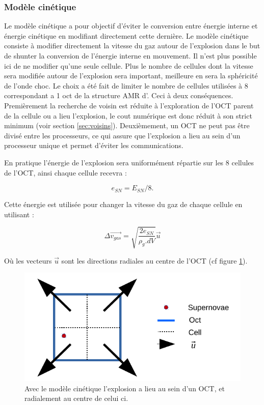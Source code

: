 \subsubsection{Modèle cinétique}

Le modèle cinétique a pour objectif d'éviter le conversion entre énergie interne et énergie cinétique en modifiant directement cette dernière.
Le modèle cinétique consiste à modifier directement la vitesse du gaz autour de l'explosion dans le but de shunter la conversion de l'énergie interne en mouvement.
Il n'est plus possible ici de ne modifier qu'une seule cellule.
Plus le nombre de cellules dont la vitesse sera modifiée autour de l'explosion sera important, meilleure en sera la sphéricité de l'onde choc.
Le choix a été fait de limiter le nombre de cellules utilisées à 8 correspondant a 1 oct de la structure \ac{AMR} d'\emma .
Ceci à deux conséquences.
Premièrement la recherche de voisin est réduite à l'exploration de l'OCT parent de la cellule ou a lieu l'explosion, le cout numérique est donc réduit à son strict minimum (voir section \ref{sec:voisins}).
Deuxièmement, un OCT ne peut pas être divisé entre les processeurs, ce qui assure que l'explosion a lieu au sein d'un processeur unique et permet d'éviter les communications.

En pratique l'énergie de l'explosion sera uniformément répartie sur les 8 cellules de l'OCT, ainsi chaque cellule recevra : 

\begin{equation}
e_{SN} = E_{SN}/8.
\end{equation}

Cette énergie est utilisée pour changer la vitesse du gaz de chaque cellule en utilisant : 

\begin{equation}
    \Delta \overrightarrow{v_{gas}} = \sqrt{\frac{2e_{SN}}{\rho_g.dV}} \overrightarrow{u}
    \label{eq_sn_direct}
\end{equation}

Où les vecteurs $\overrightarrow{u}$ sont les directions radiales au centre de l'OCT (cf figure \ref{fig:kin}).

\begin{figure}
        \includegraphics[width=.95\linewidth]{img/03/oct_kinetic.pdf} 
        \caption[Injection d'énergie cinétique]{Avec le modèle cinétique l'explosion a lieu au sein d'un OCT, et radialement au centre de celui ci.
 		\label{fig:kin}}
\end{figure}

